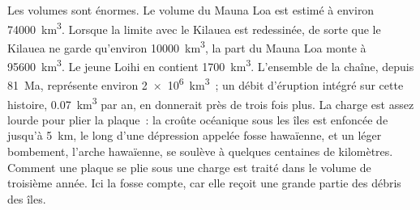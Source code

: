 Les volumes sont énormes. Le volume du Mauna Loa est estimé à environ \qty{74000}{km^3}. Lorsque la limite
avec le Kilauea est redessinée, de sorte que le Kilauea ne garde qu'environ \qty{10000}{km^3}, la part du
Mauna Loa monte à \qty{95600}{km^3}. Le jeune Loihi en contient \qty{1700}{km^3}. L'ensemble de la chaîne,
depuis \qty{81}{Ma}, représente environ \qty{2e6}{km^3}~; un débit d'éruption intégré sur cette histoire, \qty{0.07}{km^3} par an, en donnerait près de trois fois plus. La
charge est assez lourde pour plier la plaque~: la croûte océanique sous les îles est enfoncée de jusqu'à
\qty{5}{km}, le long d'une dépression appelée fosse hawaïenne, et un léger bombement, l'arche hawaïenne,
se soulève à quelques centaines de kilomètres. Comment une plaque se plie sous une charge est traité dans
le volume de troisième année. Ici la fosse compte, car elle reçoit une grande partie des débris des îles.

